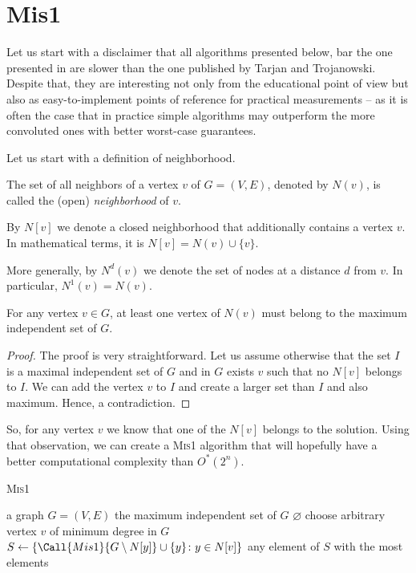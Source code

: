 \section{Mis1}

Let us start with a disclaimer that all algorithms presented below, bar the one presented in  are slower than the one published by Tarjan and Trojanowski. Despite that, they are interesting not only from the educational point of view but also as easy-to-implement points of reference for practical measurements -- as it is often the case that in practice simple algorithms may outperform the more convoluted ones with better worst-case guarantees.

Let us start with a definition of neighborhood.

\begin{defn}[neighborhood]
The set of all neighbors of a vertex $v$ of $G = (V, E)$, denoted by $N(v)$, is called the (open) \emph{neighborhood} of $v$.

By $N[v]$ we denote a closed neighborhood that additionally contains a vertex $v$. In mathematical terms, it is $N[v]=N(v) \cup \{v\}$.
\end{defn}
More generally, by $N^d(v)$ we denote the set of nodes at a distance $d$ from $v$. In particular, $N^1(v) = N(v)$.

\begin{lemma}
For any vertex $v\in G$, at least one vertex of $N(v)$ must belong to the maximum independent set of $G$.
\end{lemma}
\begin{proof}
    The proof is very straightforward. Let us assume otherwise that the set $I$ is a maximal independent set of $G$ and in $G$ exists $v$ such that no $N[v]$ belongs to $I$. We can add the vertex $v$ to $I$ and create a larger set than $I$ and also maximum. Hence, a contradiction.
\end{proof}

So, for any vertex $v$ we know that one of the $N[v]$ belongs to the solution. Using that observation, we can create a \textsc{Mis1} algorithm that will hopefully have a better computational complexity than $O^*(2^n)$. 

\begin{algorithm}
\caption{\textsc{Mis1}}\label{mis1}
\begin{algorithmic}[1]
\Require a graph $G=(V,E)$
\Ensure the maximum independent set of $G$
        \State \Return $\varnothing$
    \EndIf
    \State choose arbitrary vertex $v$ of minimum degree in $G$
    \State $S \gets \{ \Call{Mis1}{G \setminus N[y]}\cup \{y\} \colon y \in N[v]\}$
    \State \Return any element of $S$ with the most elements    
\EndProcedure
\end{algorithmic}
\end{algorithm}

